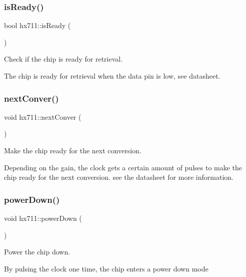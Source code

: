 \subsubsection{\texorpdfstring{is\+Ready()}{isReady()}}
{\footnotesize\ttfamily bool hx711\+::is\+Ready (\begin{DoxyParamCaption}{ }\end{DoxyParamCaption})}



Check if the chip is ready for retrieval. 

The chip is ready for retrieval when the data pin is low, see datasheet. \mbox{\label{classhx711_adf28a62a6d06f522614694ab4df96f3f}} 
\subsubsection{\texorpdfstring{next\+Conver()}{nextConver()}}
{\footnotesize\ttfamily void hx711\+::next\+Conver (\begin{DoxyParamCaption}{ }\end{DoxyParamCaption})}



Make the chip ready for the next conversion. 

Depending on the gain, the clock gets a certain amount of pulses to make the chip ready for the next conversion. see the datasheet for more information. \mbox{\label{classhx711_a3089898e9aad597a5d985ce2f8a9f5b8}} 
\subsubsection{\texorpdfstring{power\+Down()}{powerDown()}}
{\footnotesize\ttfamily void hx711\+::power\+Down (\begin{DoxyParamCaption}{ }\end{DoxyParamCaption})}



Power the chip down. 

By pulsing the clock one time, the chip enters a power down mode \mbox{\label{classhx711_aab22b06484907dc75d4115e7065977c0}} 
